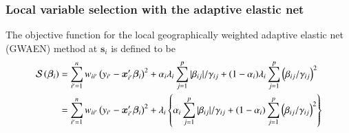 \documentclass[authoryear, review, 11pt]{elsarticle}
\begin{document}

	\subsubsection{Local variable selection with the adaptive elastic net}
	The objective function for the local geographically weighted adaptive elastic net (GWAEN) method at $\bm{s}_i$ is defined to be
	\begin{align}
		\mathcal{S}\left(\bm{\beta}_i\right) &= \sum_{i'=1}^n w_{ii'} \left(y_{i'} - \bm{x}'_{i'} \bm{\beta}_i \right)^2 + \alpha_i \lambda_i \sum_{j=1}^p |\beta_{ij}| / \gamma_{ij} + (1-\alpha_i) \lambda_i \sum_{j=1}^p  \left( \beta_{ij} / \gamma_{ij} \right)^2\notag\\
		&= \sum_{i'=1}^n w_{ii'} \left(y_{i'} - \bm{x}'_{i'} \bm{\beta}_i \right)^2 + \lambda_i \left\{\alpha_i \sum_{j=1}^p |\beta_{ij}| / \gamma_{ij} + (1-\alpha_i) \sum_{j=1}^p  \left( \beta_{ij} / \gamma_{ij} \right)^2 \right\}
	\end{align}
	
\end{document}
